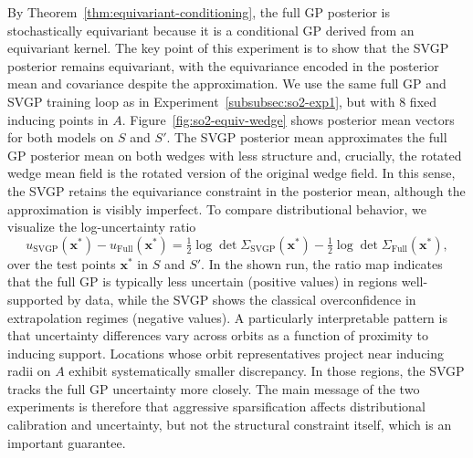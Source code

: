 \documentclass[11pt,a4paper]{article}
\newcommand{\bx}{\boldsymbol{x}}
\newcommand{\bxast}{\boldsymbol{x^\ast}}
\newcommand{\by}{\boldsymbol{y}}
\begin{document}
By Theorem~\ref{thm:equivariant-conditioning}, the full GP posterior is stochastically equivariant because it is a conditional GP derived from an equivariant kernel. The key point of this experiment is to show that the SVGP posterior remains equivariant, with the equivariance encoded in the posterior mean and covariance despite the approximation. We use the same full GP and SVGP training loop as in Experiment~\ref{subsubsec:so2-exp1}, but with 8 fixed inducing points in $A$. Figure~\ref{fig:so2-equiv-wedge} shows posterior mean vectors for both models on $S$ and $S'$. The SVGP posterior mean approximates the full GP posterior mean on both wedges with less structure and, crucially, the rotated wedge mean field is the rotated version of the original wedge field. In this sense, the SVGP retains the equivariance constraint in the posterior mean, although the approximation is visibly imperfect.
To compare distributional behavior, we visualize the log-uncertainty ratio
\begin{displaymath}u_{\mathrm{SVGP}}(\bxast)-u_{\mathrm{Full}}(\bxast) = \tfrac12\log\det\Sigma_{\mathrm{SVGP}}(\bxast)-\tfrac12\log\det\Sigma_{\mathrm{Full}}(\bxast),\end{displaymath}
over the test points $\bxast$ in $S$ and $S'$. In the shown run, the ratio map indicates that the full GP is typically less uncertain (positive values) in regions well-supported by data, while the SVGP shows the classical overconfidence in extrapolation regimes (negative values).
A particularly interpretable pattern is that uncertainty differences vary across orbits as a function of proximity to inducing support. Locations whose orbit representatives project near inducing radii on $A$ exhibit systematically smaller discrepancy. In those regions, the SVGP tracks the full GP uncertainty more closely. The main message of the two experiments is therefore that aggressive sparsification affects distributional calibration and uncertainty, but not the structural constraint itself, which is an important guarantee.%
\end{document}
